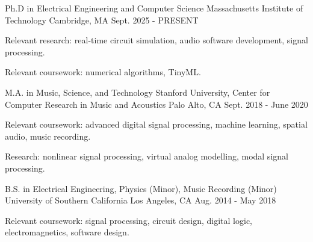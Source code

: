 

\begin{cventries}

    \cventry
    {Ph.D in Electrical Engineering and Computer Science} %
    {Massachusetts Institute of Technology} %
    {Cambridge, MA} %
    {Sept. 2025 - PRESENT} %
    {
      \begin{cvitems} %
        \item {Relevant research: real-time circuit simulation, audio software development, signal processing.}
        \item {Relevant coursework: numerical algorithms, TinyML.}
      \end{cvitems}
    }

    \cventry
    {M.A. in Music, Science, and Technology} %
    {Stanford University, Center for Computer Research in Music and Acoustics} %
    {Palo Alto, CA} %
    {Sept. 2018 - June 2020} %
    {
      \begin{cvitems} %
        \item {Relevant coursework: advanced digital signal processing, machine learning, spatial audio, music recording.}
        \item {Research: nonlinear signal processing, virtual analog modelling, modal signal processing.}
      \end{cvitems}
    }

    \cventry
    {B.S. in Electrical Engineering, Physics (Minor), Music Recording (Minor)} %
    {University of Southern California} %
    {Los Angeles, CA} %
    {Aug. 2014 - May 2018} %
    {
      \begin{cvitems} %
        \item {Relevant coursework: signal processing, circuit design, digital logic, electromagnetics, software design.}
      \end{cvitems}
    }

\end{cventries}

